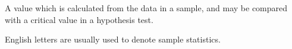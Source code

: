  A value which is calculated from the data in a sample, and may
be compared with a critical value in a hypothesis test.
\par
English letters are usually used to denote sample statistics.
